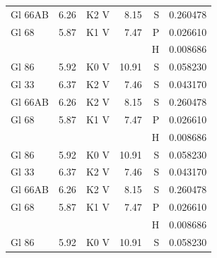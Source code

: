 \documentclass{aa}
\begin{document}
\begin{appendix}
\begin{landscape}
\begin{longtable}{lllrrr}
Gl 66AB  & 6.26 & K2 V & 8.15 & S & 0.260478\\
Gl 68    & 5.87 & K1 V & 7.47 & P & 0.026610\\
         &      &      &      & H & 0.008686\\
Gl 86    & 5.92 & K0 V & 10.91& S & 0.058230\\   Gl 33    & 6.37 & K2 V & 7.46 & S & 0.043170\\
Gl 66AB  & 6.26 & K2 V & 8.15 & S & 0.260478\\
Gl 68    & 5.87 & K1 V & 7.47 & P & 0.026610\\
         &      &      &      & H & 0.008686\\
Gl 86    & 5.92 & K0 V & 10.91& S & 0.058230\\   Gl 33    & 6.37 & K2 V & 7.46 & S & 0.043170\\
Gl 66AB  & 6.26 & K2 V & 8.15 & S & 0.260478\\
Gl 68    & 5.87 & K1 V & 7.47 & P & 0.026610\\
         &      &      &      & H & 0.008686\\
Gl 86    & 5.92 & K0 V & 10.91& S & 0.058230\\   
\end{longtable}
\end{landscape}


\FloatBarrier %
\clearpage


\end{appendix}
\end{document}
